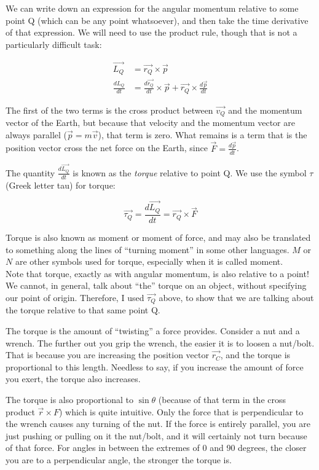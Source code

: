 We can write down an expression for the angular momentum relative to some point Q (which can be any point whatsoever), and then take the time derivative of that expression. We will need to use the product rule, though that is not a particularly difficult task:

\begin{align}
\vec{L_Q} &= \vec{r_Q} \times \vec{p}\\
\frac{dL_Q}{dt} &= \frac{d\vec{r_Q}}{dt} \times \vec{p} + \vec{r_Q} \times \frac{d\vec{p}}{dt}
\end{align}

The first of the two terms is the cross product between $\vec{v_Q}$ and the momentum vector of the Earth, but because that velocity and the momentum vector are always parallel ($\vec{p} = m \vec{v}$), that term is zero. What remains is a term that is the position vector cross the net force on the Earth, since $\displaystyle \vec{F} = \frac{d\vec{p}}{dt}$.

The quantity $\displaystyle \frac{d\vec{L_Q}}{dt}$ is known as the \emph{torque} relative to point Q. We use the symbol $\tau$ (Greek letter tau) for torque:

\begin{equation}
\vec{\tau_Q} = \frac{d\vec{L_Q}}{dt} = \vec{r_Q} \times \vec{F}
\end{equation}

Torque is also known as moment or moment of force, and may also be translated to something along the lines of ``turning moment'' in some other languages. $M$ or $N$ are other symbols used for torque, especially when it is called moment.\\
Note that torque, exactly as with angular momentum, is also relative to a point! We cannot, in general, talk about ``the'' torque on an object, without specifying our point of origin. Therefore, I used $\vec{\tau_Q}$ above, to show that we are talking about the torque relative to that same point Q.

The torque is the amount of ``twisting'' a force provides. Consider a nut and a wrench. The further out you grip the wrench, the easier it is to loosen a nut/bolt. That is because you are increasing the position vector $\vec{r_C}$, and the torque is proportional to this length. Needless to say, if you increase the amount of force you exert, the torque also increases.

The torque is also proportional to $\sin \theta$ (because of that term in the cross product $\vec{r} \times {F}$) which is quite intuitive. Only the force that is perpendicular to the wrench causes any turning of the nut. If the force is entirely parallel, you are just pushing or pulling on it the nut/bolt, and it will certainly not turn because of that force. For angles in between the extremes of 0 and 90 degrees, the closer you are to a perpendicular angle, the stronger the torque is.

